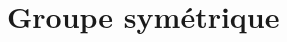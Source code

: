 \documentclass[../main.tex]{subfiles}
\begin{document}
\setcounter{chapter}{28}
\chapter{Groupe symétrique}
\tableofcontents
\clearpage
\end{document}
